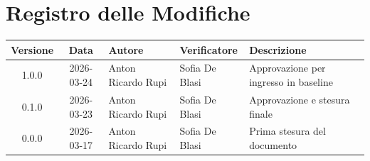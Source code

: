 \section*{Registro delle Modifiche}
\begin{table}[ht]
	\centering
	\renewcommand{\arraystretch}{1.5}
	\begin{tabularx}{\textwidth}{c c l l X}
		\toprule
		\textbf{Versione} & \textbf{Data} & \textbf{Autore} & \textbf{Verificatore} & \textbf{Descrizione} \\
		\midrule
		1.0.0 & 2026-03-24 & Anton Ricardo Rupi & Sofia De Blasi & Approvazione per ingresso in baseline \\
		0.1.0 & 2026-03-23 & Anton Ricardo Rupi & Sofia De Blasi & Approvazione e stesura finale \\
		0.0.0 & 2026-03-17 & Anton Ricardo Rupi & Sofia De Blasi & Prima stesura del documento \\
		\bottomrule
	\end{tabularx}
\end{table}